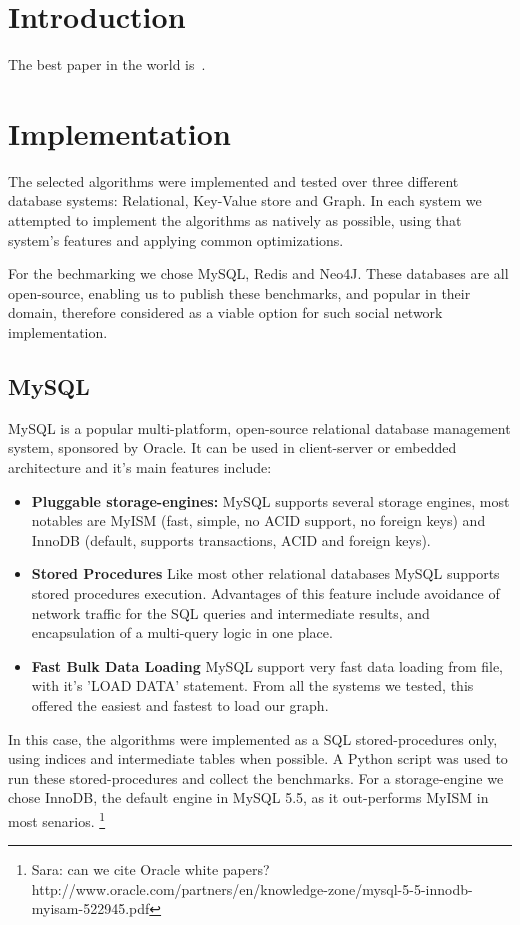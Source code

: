 \section{Introduction}
The best paper in the world is~\cite{Liben-Nowell:2003:LPP:956863.956972}.



\section{Implementation}
The selected algorithms were implemented and tested over three different 
database systems: Relational, Key-Value store and Graph. 
In each system we attempted to implement the algorithms as natively as possible, 
using that system's features and applying common optimizations. 

For the bechmarking we chose MySQL, Redis and Neo4J.
These databases are all open-source, enabling us to publish these benchmarks,
and popular in their domain, therefore considered as a viable option for such social network implementation.

\subsection{MySQL}
MySQL is a popular multi-platform, open-source relational database management
system, sponsored by Oracle. It can be used in client-server or embedded
architecture and it's main features include: 
\begin{itemize}
	\item {\bf Pluggable storage-engines:} MySQL supports several storage engines, 
		most notables are MyISM (fast, simple, no ACID support, no foreign keys) and
		InnoDB (default, supports transactions, ACID and foreign keys).
	\item {\bf Stored Procedures} Like most other relational databases MySQL supports 
		stored procedures execution. Advantages of this feature include 
		avoidance of network traffic for the SQL queries and intermediate results,
		and encapsulation of a multi-query logic in one place.
	\item {\bf Fast Bulk Data Loading} MySQL support very fast data loading from file,
		with it's 'LOAD DATA' statement. From all the systems we tested, this offered 
		the easiest and fastest to load our graph.
\end{itemize}

In this case, the algorithms were implemented as a SQL stored-procedures only,
using indices and intermediate tables when possible. A Python script was used
to run these stored-procedures and collect the benchmarks. For a storage-engine 
we chose InnoDB, the default engine in MySQL 5.5, as it out-performs MyISM in 
most senarios. \footnote{Sara: can we cite Oracle white papers? http://www.oracle.com/partners/en/knowledge-zone/mysql-5-5-innodb-myisam-522945.pdf}

